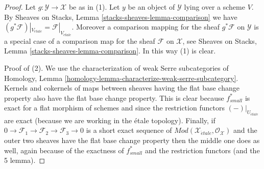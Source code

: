 \documentclass[10pt,a4paper]{amsart}
\theoremstyle{plain}
\theoremstyle{definition}
\theoremstyle{remark}
\numberwithin{equation}{subsection}
\def\etale{{\acute{e}tale}}
\begin{document}
\begin{proof}
Let $g : \mathcal{Y} \to \mathcal{X}$ be as in (1).
Let $y$ be an object of $\mathcal{Y}$ lying over a scheme $V$. By
Sheaves on Stacks, Lemma \ref{stacks-sheaves-lemma-comparison}
we have
$(g^*\mathcal{F})|_{V_\etale} = \mathcal{F}|_{V_\etale}$.
Moreover a comparison mapping for the sheaf $g^*\mathcal{F}$ on $\mathcal{Y}$
is a special case of a comparison map for the sheaf $\mathcal{F}$ on
$\mathcal{X}$, see
Sheaves on Stacks, Lemma \ref{stacks-sheaves-lemma-comparison}.
In this way (1) is clear.

\medskip\noindent
Proof of (2). We use the characterization of weak Serre subcategories of
Homology, Lemma \ref{homology-lemma-characterize-weak-serre-subcategory}.
Kernels and cokernels of
maps between sheaves having the flat base change property
also have the flat base change property. This is clear because
$f_{small}^*$ is exact for a flat morphism of schemes and since the
restriction functors $(-)|_{U_\etale}$ are exact (because we
are working in the \'etale topology). Finally, if
$0 \to \mathcal{F}_1 \to \mathcal{F}_2 \to \mathcal{F}_3 \to 0$
is a short exact sequence of
$\textit{Mod}(\mathcal{X}_\etale, \mathcal{O}_\mathcal{X})$
and the outer two sheaves have the flat base change property then
the middle one does as well, again because of the exactness of
$f_{small}^*$ and the restriction functors (and the 5 lemma).


\end{proof}
\end{document}
